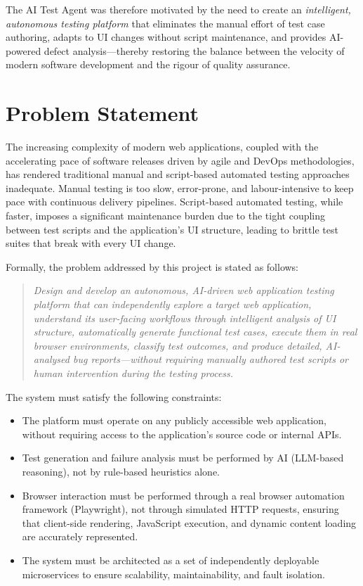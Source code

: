 The AI Test Agent was therefore motivated by the need to create an \emph{intelligent, autonomous testing platform} that eliminates the manual effort of test case authoring, adapts to UI changes without script maintenance, and provides AI-powered defect analysis---thereby restoring the balance between the velocity of modern software development and the rigour of quality assurance.


\section{Problem Statement}
\label{sec:problem_statement}

The increasing complexity of modern web applications, coupled with the accelerating pace of software releases driven by agile and DevOps methodologies, has rendered traditional manual and script-based automated testing approaches inadequate. Manual testing is too slow, error-prone, and labour-intensive to keep pace with continuous delivery pipelines. Script-based automated testing, while faster, imposes a significant maintenance burden due to the tight coupling between test scripts and the application's UI structure, leading to brittle test suites that break with every UI change.

Formally, the problem addressed by this project is stated as follows:

\begin{quote}
\emph{Design and develop an autonomous, AI-driven web application testing platform that can independently explore a target web application, understand its user-facing workflows through intelligent analysis of UI structure, automatically generate functional test cases, execute them in real browser environments, classify test outcomes, and produce detailed, AI-analysed bug reports---without requiring manually authored test scripts or human intervention during the testing process.}
\end{quote}

The system must satisfy the following constraints:
\begin{itemize}
    \item The platform must operate on any publicly accessible web application, without requiring access to the application's source code or internal APIs.
    \item Test generation and failure analysis must be performed by AI (LLM-based reasoning), not by rule-based heuristics alone.
    \item Browser interaction must be performed through a real browser automation framework (Playwright), not through simulated HTTP requests, ensuring that client-side rendering, JavaScript execution, and dynamic content loading are accurately represented.
    \item The system must be architected as a set of independently deployable microservices to ensure scalability, maintainability, and fault isolation.
\end{itemize}


